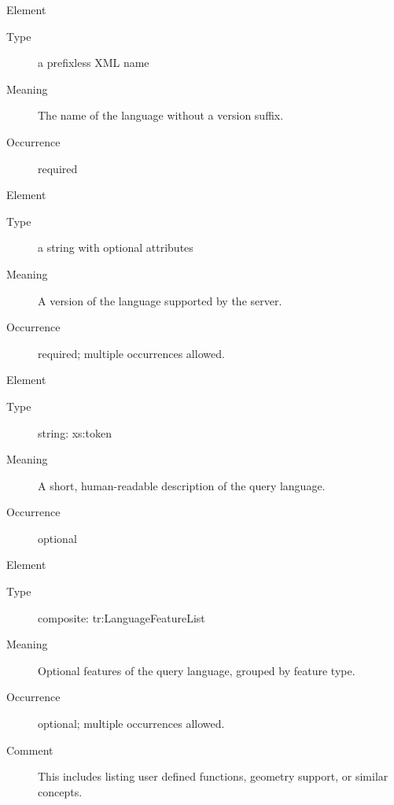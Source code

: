 \documentclass{ivoa}
\begin{document}
\begin{bigdescription}\item[Element \xmlel{name}]
\begin{description}
\item[Type\quad] a prefixless XML name
\item[Meaning\quad] 
          The name of the language without a version suffix.
          
\item[Occurrence\quad] required

\end{description}
\item[Element \xmlel{version}]
\begin{description}
\item[Type\quad] a string with optional attributes
\item[Meaning\quad] 
		    		A version of the language supported by the server.
		    	
\item[Occurrence\quad] required; multiple occurrences allowed.

\end{description}
\item[Element \xmlel{description}]
\begin{description}
\item[Type\quad] string: xs:token
\item[Meaning\quad] 
          A short, human-readable description of the
          query language.
          
\item[Occurrence\quad] optional

\end{description}
\item[Element \xmlel{languageFeatures}]
\begin{description}
\item[Type\quad] composite: tr:LanguageFeatureList
\item[Meaning\quad] 
          	Optional features of the query language, grouped by
          	feature type.
        	
\item[Occurrence\quad] optional; multiple occurrences allowed.
\item[Comment\quad] 
        		This includes listing user defined functions, geometry support,
        		or similar concepts.
        	

\end{description}


\end{bigdescription}
\end{document}
